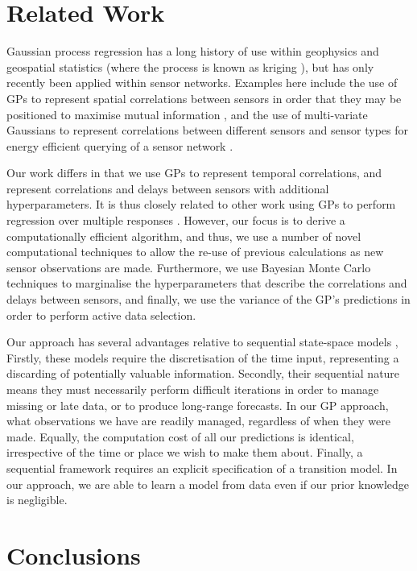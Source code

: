 \documentclass{acmtrans2m}
\begin{document}
\section{Related Work}\label{sec_related}

\noindent Gaussian process regression has a long history of use within geophysics and geospatial statistics (where the process is known as kriging \cite{cressie}), but has only recently been applied within sensor networks. Examples here include the use of GPs to represent spatial correlations between sensors in order that they may be positioned to maximise mutual information \cite{guestrin1}, and the use of multi-variate Gaussians to represent correlations between different sensors and sensor types for energy efficient querying of a sensor network \cite{guestrin2}. 

Our work differs in that we use GPs to represent temporal correlations, and represent correlations and delays between sensors with additional hyperparameters. It is thus closely related to other work using GPs to perform regression over multiple responses \cite{dep_GP,latent_factor}. However, our focus is to derive a computationally efficient algorithm, and thus, we use a number of novel computational techniques to allow the re-use of previous calculations as new sensor observations are made. Furthermore, we use Bayesian Monte Carlo techniques to marginalise the hyperparameters that describe the correlations and delays between sensors, and finally, we use the variance of the GP's predictions in order to perform active data selection.

Our approach has several advantages relative to sequential state-space models \cite{Girard,Jazwinski}, Firstly, these models require the discretisation of the time input, representing a discarding of potentially valuable information. Secondly, their sequential nature means they must necessarily perform difficult iterations in order to manage missing or late data, or to produce long-range forecasts. In our GP approach, what observations we have are readily managed, regardless of when they were made. Equally, the computation cost of all our predictions is identical, irrespective of the time or place we wish to make them about. Finally, a sequential framework requires an explicit specification of a transition model. In our approach, we are able to learn a model from data even if our prior knowledge is negligible.


\section{Conclusions}\label{sec_conclusion}
\end{document}
